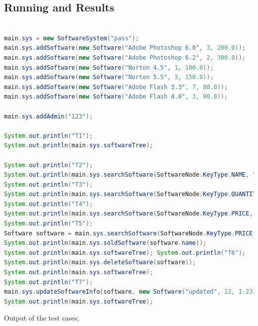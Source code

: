 \documentclass[a4paper]{article}
\begin{document}
\begin{large}
  \section{Running and Results}

  \begin{lstlisting}[language=Java, caption=Testing methods in main method]

main.sys = new SoftwareSystem("pass");
main.sys.addSoftware(new Software("Adobe Photoshop 6.0", 3, 200.0));
main.sys.addSoftware(new Software("Adobe Photoshop 6.2", 2, 300.0));
main.sys.addSoftware(new Software("Norton 4.5", 1, 100.0));
main.sys.addSoftware(new Software("Norton 5.5", 3, 150.0));
main.sys.addSoftware(new Software("Adobe Flash 3.3", 7, 80.0));
main.sys.addSoftware(new Software("Adobe Flash 4.0", 3, 90.0));

main.sys.addAdmin("123");

System.out.println("T1");
System.out.println(main.sys.softwareTree);

System.out.println("T2");
System.out.println(main.sys.searchSoftware(SoftwareNode.KeyType.NAME, "Adobe Photoshop 6.0"));
System.out.println("T3");
System.out.println(main.sys.searchSoftware(SoftwareNode.KeyType.QUANTITY, 1));
System.out.println("T4");
System.out.println(main.sys.searchSoftware(SoftwareNode.KeyType.PRICE, 90.0));
System.out.println("T5");
Software software = main.sys.searchSoftware(SoftwareNode.KeyType.PRICE, 90.0);
System.out.println(main.sys.soldSoftware(software.name));
System.out.println(main.sys.softwareTree); System.out.println("T6");
System.out.println(main.sys.deleteSoftware(software));
System.out.println(main.sys.softwareTree);
System.out.println("T7");
main.sys.updateSoftwareInfo(software, new Software("updated", 12, 1.23));
System.out.println(main.sys.softwareTree);


  \end{lstlisting}

  \newpage

  Output of the test cases;


\end{large}
\end{document}
